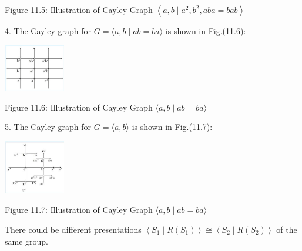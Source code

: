 Figure 11.5: Illustration of Cayley Graph \(\left\langle  {a,b \mid  {a}^{2},{b}^{2},{aba} = {bab}}\right\rangle\)

4. The Cayley graph for \(G = \langle a,b \mid  {ab} = {ba}\rangle\) is shown in Fig.(11.6):

\begin{center}
\includegraphics[max width=0.2\textwidth]{images/bo_d2bcsrref24c73avs720_111_805_742_343_264_0.jpg}
\end{center}
\hspace*{3em} 

Figure 11.6: Illustration of Cayley Graph \(\langle a,b \mid  {ab} = {ba}\rangle\)

5. The Cayley graph for \(G = \langle a,b\rangle\) is shown in Fig.(11.7):

\begin{center}
\includegraphics[max width=0.2\textwidth]{images/bo_d2bcsrref24c73avs720_111_809_1204_329_290_0.jpg}
\end{center}
\hspace*{3em} 

Figure 11.7: Illustration of Cayley Graph \(\langle a,b \mid  {ab} = {ba}\rangle\)

There could be different presentations \(\left\langle  {{S}_{1} \mid  R\left( {S}_{1}\right) }\right\rangle   \cong  \left\langle  {{S}_{2} \mid  R\left( {S}_{2}\right) }\right\rangle\) of the same group.